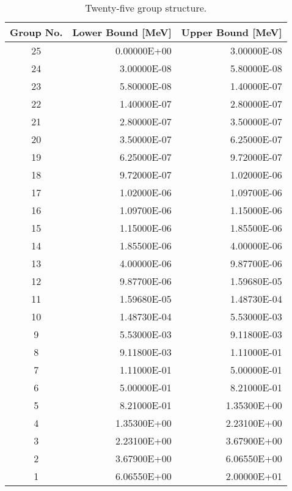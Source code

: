 \begin{appendices}
\begin{table}[h!]
  \centering
  \footnotesize
  \caption{Twenty-five group structure.}
  \label{table:app-25-groups} 
  \vspace{14pt}
  \begin{tabular}{c r r}
    \toprule
    {\bf Group No.} &
    {\bf Lower Bound [MeV]} &
    {\bf Upper Bound [MeV]} \\
    \midrule
25 & 0.00000E+00 & 3.00000E-08 \\
24 & 3.00000E-08 & 5.80000E-08 \\
23 & 5.80000E-08 & 1.40000E-07 \\
22 & 1.40000E-07 & 2.80000E-07 \\
21 & 2.80000E-07 & 3.50000E-07 \\
20 & 3.50000E-07 & 6.25000E-07 \\
19 & 6.25000E-07 & 9.72000E-07 \\
18 & 9.72000E-07 & 1.02000E-06 \\
17 & 1.02000E-06 & 1.09700E-06 \\
16 & 1.09700E-06 & 1.15000E-06 \\
15 & 1.15000E-06 & 1.85500E-06 \\
14 & 1.85500E-06 & 4.00000E-06 \\
13 & 4.00000E-06 & 9.87700E-06 \\
12 & 9.87700E-06 & 1.59680E-05 \\
11 & 1.59680E-05 & 1.48730E-04 \\
10 & 1.48730E-04 & 5.53000E-03 \\
9 & 5.53000E-03 & 9.11800E-03 \\
8 & 9.11800E-03 & 1.11000E-01 \\
7 & 1.11000E-01 & 5.00000E-01 \\
6 & 5.00000E-01 & 8.21000E-01 \\
5 & 8.21000E-01 & 1.35300E+00 \\
4 & 1.35300E+00 & 2.23100E+00 \\
3 & 2.23100E+00 & 3.67900E+00 \\
2 & 3.67900E+00 & 6.06550E+00 \\
1 & 6.06550E+00 & 2.00000E+01 \\
  \bottomrule
 \end{tabular}
\end{table}


\end{appendices}
